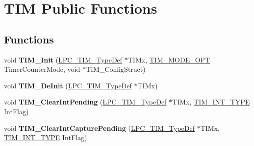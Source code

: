 \hypertarget{group___t_i_m___public___functions}{\section{\-T\-I\-M \-Public \-Functions}
\label{group___t_i_m___public___functions}
}
\subsection*{\-Functions}
\begin{DoxyCompactItemize}
\item 
\hypertarget{group___t_i_m___public___functions_ga052e792d1675f752565355630d1476f8}{void {\bfseries \-T\-I\-M\-\_\-\-Init} (\hyperlink{struct_l_p_c___t_i_m___type_def}{\-L\-P\-C\-\_\-\-T\-I\-M\-\_\-\-Type\-Def} $\ast$\-T\-I\-Mx, \hyperlink{group___t_i_m___public___types_gacb2a94f8fe0bdfc2435033d97569dc2b}{\-T\-I\-M\-\_\-\-M\-O\-D\-E\-\_\-\-O\-P\-T} \-Timer\-Counter\-Mode, void $\ast$\-T\-I\-M\-\_\-\-Config\-Struct)}\label{group___t_i_m___public___functions_ga052e792d1675f752565355630d1476f8}

\item 
\hypertarget{group___t_i_m___public___functions_ga917a24a39c3f631c2dcd93e425249f9a}{void {\bfseries \-T\-I\-M\-\_\-\-De\-Init} (\hyperlink{struct_l_p_c___t_i_m___type_def}{\-L\-P\-C\-\_\-\-T\-I\-M\-\_\-\-Type\-Def} $\ast$\-T\-I\-Mx)}\label{group___t_i_m___public___functions_ga917a24a39c3f631c2dcd93e425249f9a}

\item 
\hypertarget{group___t_i_m___public___functions_ga1d986450fc78b1ee482fa16e815971ef}{void {\bfseries \-T\-I\-M\-\_\-\-Clear\-Int\-Pending} (\hyperlink{struct_l_p_c___t_i_m___type_def}{\-L\-P\-C\-\_\-\-T\-I\-M\-\_\-\-Type\-Def} $\ast$\-T\-I\-Mx, \hyperlink{group___t_i_m___public___types_ga2fd69882c6757b73b5728fd321d3104c}{\-T\-I\-M\-\_\-\-I\-N\-T\-\_\-\-T\-Y\-P\-E} \-Int\-Flag)}\label{group___t_i_m___public___functions_ga1d986450fc78b1ee482fa16e815971ef}

\item 
\hypertarget{group___t_i_m___public___functions_ga93cd0612b2351a11bc9e3abfb0ece226}{void {\bfseries \-T\-I\-M\-\_\-\-Clear\-Int\-Capture\-Pending} (\hyperlink{struct_l_p_c___t_i_m___type_def}{\-L\-P\-C\-\_\-\-T\-I\-M\-\_\-\-Type\-Def} $\ast$\-T\-I\-Mx, \hyperlink{group___t_i_m___public___types_ga2fd69882c6757b73b5728fd321d3104c}{\-T\-I\-M\-\_\-\-I\-N\-T\-\_\-\-T\-Y\-P\-E} \-Int\-Flag)}\label{group___t_i_m___public___functions_ga93cd0612b2351a11bc9e3abfb0ece226}


\end{DoxyCompactItemize}

